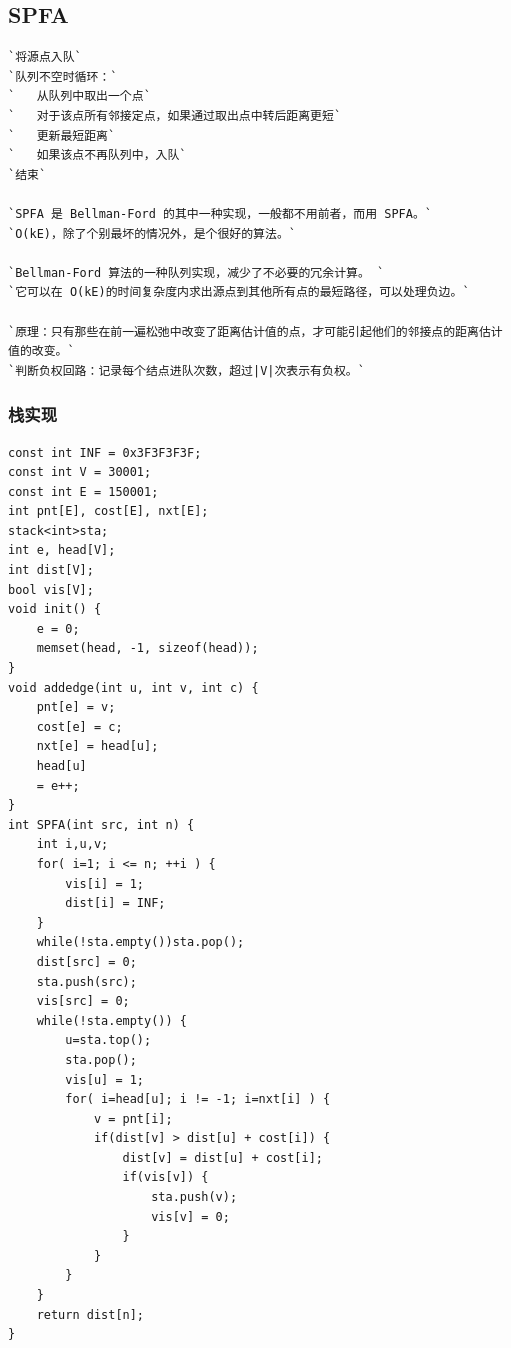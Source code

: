 \documentclass[a4paper]{article}
\begin{document}
\begin{CJK*}{UTF8}{gbsn}
\begin{multicols}{3}
\begin{flushleft}
\subsection{SPFA}
\begin{lstlisting}
`将源点入队`
`队列不空时循环：`
`	从队列中取出一个点`
`	对于该点所有邻接定点，如果通过取出点中转后距离更短`
`	更新最短距离`
`	如果该点不再队列中，入队`
`结束`

`SPFA 是 Bellman-Ford 的其中一种实现，一般都不用前者，而用 SPFA。`
`O(kE)，除了个别最坏的情况外，是个很好的算法。`

`Bellman-Ford 算法的一种队列实现，减少了不必要的冗余计算。 `
`它可以在 O(kE)的时间复杂度内求出源点到其他所有点的最短路径，可以处理负边。`

`原理：只有那些在前一遍松弛中改变了距离估计值的点，才可能引起他们的邻接点的距离估计值的改变。`
`判断负权回路：记录每个结点进队次数，超过|V|次表示有负权。`

\end{lstlisting}

\subsubsection{栈实现}
\begin{lstlisting}
const int INF = 0x3F3F3F3F;
const int V = 30001;
const int E = 150001;
int pnt[E], cost[E], nxt[E];
stack<int>sta;
int e, head[V];
int dist[V];
bool vis[V];
void init() {
    e = 0;
    memset(head, -1, sizeof(head));
}
void addedge(int u, int v, int c) {
    pnt[e] = v;
    cost[e] = c;
    nxt[e] = head[u];
    head[u]
    = e++;
}
int SPFA(int src, int n) {
    int i,u,v;
    for( i=1; i <= n; ++i ) {
        vis[i] = 1;
        dist[i] = INF;
    }
    while(!sta.empty())sta.pop();
    dist[src] = 0;
    sta.push(src);
    vis[src] = 0;
    while(!sta.empty()) {
        u=sta.top();
        sta.pop();
        vis[u] = 1;
        for( i=head[u]; i != -1; i=nxt[i] ) {
            v = pnt[i];
            if(dist[v] > dist[u] + cost[i]) {
                dist[v] = dist[u] + cost[i];
                if(vis[v]) {
                    sta.push(v);
                    vis[v] = 0;
                }
            }
        }
    }
    return dist[n];
}
\end{lstlisting}


\end{flushleft}
\end{multicols}
\end{CJK*}
\end{document}
